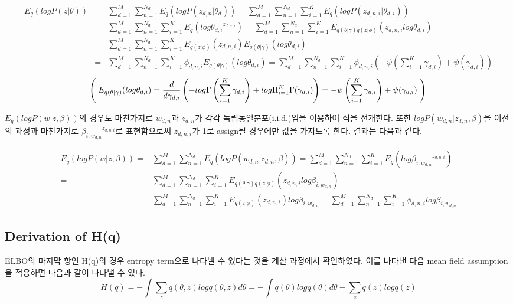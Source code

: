 \documentclass[draft=false]{oblivoir}
\begin{document}
\begin{eqnarray}
E_{q}(log P(z|\theta)) & = &  \sum^{M}_{d=1}\sum^{N_{d}}_{n=1}E_{q}(logP(z_{d,n}|\theta_{d})) = \sum^{M}_{d=1}\sum^{N_{d}}_{n=1}\sum^{K}_{i=1}E_{q}(logP(z_{d,n,i}|\theta_{d,i}))\nonumber\\
& = & \sum^{M}_{d=1}\sum^{N_{d}}_{n=1}\sum^{K}_{i=1}E_{q}(log{\theta_{d,i}}^{z_{d,n,i}}) = \sum^{M}_{d=1}\sum^{N_{d}}_{n=1}\sum^{K}_{i=1}E_{q(\theta|\gamma)q(z|\phi)}(z_{d,n,i}log\theta_{d,i})\nonumber\\
& = & \sum^{M}_{d=1}\sum^{N_{d}}_{n=1}\sum^{K}_{i=1}E_{q(z|\phi)}(z_{d,n,i})E_{q(\theta|\gamma)}(log\theta_{d,i})\nonumber\\
& = & \sum^{M}_{d=1}\sum^{N_{d}}_{n=1}\sum^{K}_{i=1}\phi_{d,n,i}E_{q(\theta|\gamma)}(log\theta_{d,i})= \sum^{M}_{d=1}\sum^{N_{d}}_{n=1}\sum^{K}_{i=1}\phi_{d,n,i}\left(-\psi\left(\sum^{K}_{i=1}\gamma_{d,i}\right)+\psi(\gamma_{d,i})\right)\nonumber
\end{eqnarray}
\begin{equation}
\left(\;E_{q(\theta|\gamma)}(log\theta_{d,i})=\frac{d}{d\gamma_{d,i}}\left(-log\Gamma\left(\sum^{K}_{i=1}\gamma_{d,i}\right)+log\Pi^{K}_{i=1} \Gamma(\gamma_{d,i})\right)=-\psi\left(\sum^{K}_{i=1}\gamma_{d,i}\right)+\psi(\gamma_{d,i})\;\right)\nonumber\\
\end{equation}

$E_{q}(log P(w|z,\beta))$의 경우도 마찬가지로 $w_{d,n}$과 $z_{d,n}$가 각각 독립동일분포(i.i.d.)임을 이용하여 식을 전개한다. 또한 $logP(w_{d,n}|z_{d,n},\beta)$을 이전의 과정과 마찬가지로 ${\beta_{i,w_{d,n}}}^{z_{d,n,i}}$로 표현함으로써 $z_{d,n,i}$가 1로 assign될 경우에만 값을 가지도록 한다. 결과는 다음과 같다.

\begin{align}
E_{q}(log P(w|z,\beta)) = {} & \sum^{M}_{d=1}\sum^{N_{d}}_{n=1}E_{q}(logP(w_{d,n}|z_{d,n},\beta)) = \sum^{M}_{d=1}\sum^{N_{d}}_{n=1}\sum^{K}_{i=1}E_{q}(log{\beta_{i,w_{d,n}}}^{z_{d,n,i}})\nonumber\\
= {} & \sum^{M}_{d=1}\sum^{N_{d}}_{n=1}\sum^{K}_{i=1} E_{q(\theta|\gamma)q(z|\phi)}(z_{d,n,i}log\beta_{i,w_{d,n}})\nonumber\\
= {} & \sum^{M}_{d=1}\sum^{N_{d}}_{n=1}\sum^{K}_{i=1} E_{q(z|\phi)}(z_{d,n,i})log\beta_{i,w_{d,n}} =  \sum^{M}_{d=1}\sum^{N_{d}}_{n=1}\sum^{K}_{i=1}\phi_{d,n,i}log\beta_{i,w_{d,n}}
\end{align}

\subsection{Derivation of H(q)}
ELBO의 마지막 항인 H(q)의 경우 entropy term으로 나타낼 수 있다는 것을 계산 과정에서 확인하였다. 이를 나타낸 다음 mean field assumption을 적용하면 다음과 같이 나타낼 수 있다.
\begin{equation}
H(q) = -\int\sum_{z}q(\theta,z)logq(\theta,z)d\theta = - \int q(\theta)logq(\theta)d\theta - \sum_{z}q(z)logq(z)\nonumber
\end{equation}
\end{document}
